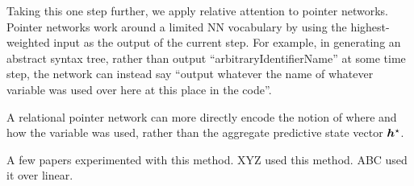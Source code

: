 %
%
%
%
%


Taking this one step further, we apply relative attention to pointer networks.
Pointer networks
work around a limited NN vocabulary by using the highest-weighted input as the 
output of the current step. For example, in generating an abstract syntax tree, 
rather than output ``arbitraryIdentifierName'' at some time step, the network 
can instead say ``output whatever the name of whatever variable was used over 
here at this place in the code''.

A relational pointer network can more directly encode the notion of where and 
how the variable was used, rather than the aggregate predictive state vector 
${\bm{h}}^\star$.

A few papers experimented with this method. XYZ used this method. ABC used it 
over linear.




